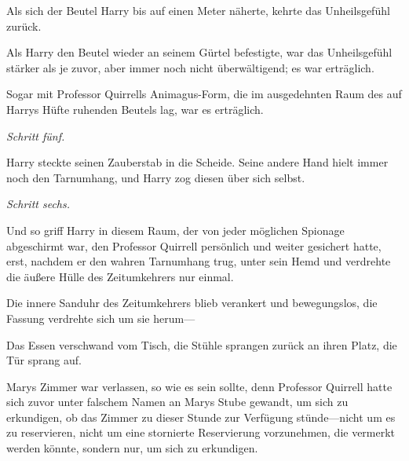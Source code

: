Als sich der Beutel Harry bis auf einen Meter näherte, kehrte das Unheilsgefühl zurück.

Als Harry den Beutel wieder an seinem Gürtel befestigte, war das Unheilsgefühl stärker als je zuvor, aber immer noch nicht überwältigend; es war erträglich.

Sogar mit Professor Quirrells Animagus-Form, die im ausgedehnten Raum des auf Harrys Hüfte ruhenden Beutels lag, war es erträglich.

\emph{Schritt fünf.}

Harry steckte seinen Zauberstab in die Scheide. Seine andere Hand hielt immer noch den Tarnumhang, und Harry zog diesen über sich selbst.

\emph{Schritt sechs.}

Und so griff Harry in diesem Raum, der von jeder möglichen Spionage abgeschirmt war, den Professor Quirrell persönlich und weiter gesichert hatte, erst, nachdem er den wahren Tarnumhang trug, unter sein Hemd und verdrehte die äußere Hülle des Zeitumkehrers nur einmal.

Die innere Sanduhr des Zeitumkehrers blieb verankert und bewegungslos, die Fassung verdrehte sich um sie herum—

Das Essen verschwand vom Tisch, die Stühle sprangen zurück an ihren Platz, die Tür sprang auf.

Marys Zimmer war verlassen, so wie es sein sollte, denn Professor Quirrell hatte sich zuvor unter falschem Namen an Marys Stube gewandt, um sich zu erkundigen, ob das Zimmer zu dieser Stunde zur Verfügung stünde—nicht um es zu reservieren, nicht um eine stornierte Reservierung vorzunehmen, die vermerkt werden könnte, sondern nur, um sich zu erkundigen.

